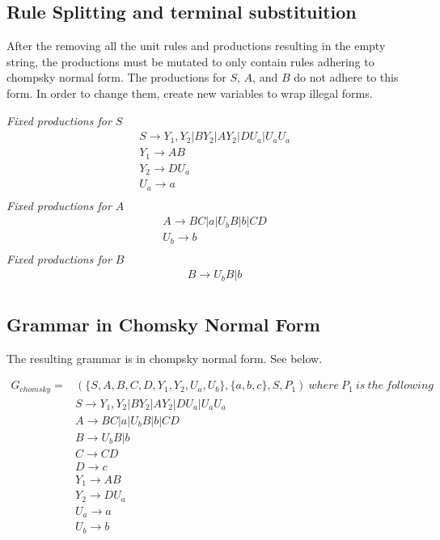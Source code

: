 \documentclass{assignment-x}
\begin{document}
\subsection{Rule Splitting and terminal substituition}
After the removing all the unit rules and productions resulting in the empty string, the productions must be mutated to only contain rules adhering to chompsky normal form. The productions for $S$, $A$, and $B$ do not adhere to this form. In order to change them, create new variables to wrap illegal forms.

\begin{center}
    \textit{Fixed productions for $S$}
    \begin{align*}
        &S \rightarrow Y_1, Y_2|BY_2|AY_2|DU_a|U_aU_a \\
        &Y_1 \rightarrow AB \\
        &Y_2 \rightarrow DU_a \\
        &U_a \rightarrow a \\
    \end{align*}
    \textit{Fixed productions for $A$}
    \begin{align*}
        &A \rightarrow BC|a|U_bB|b|CD \\
        &U_b \rightarrow b \\
    \end{align*}
    \textit{Fixed productions for $B$}
    \begin{align*}
        &B \rightarrow U_bB|b \\
    \end{align*}
\end{center}

\subsection{Grammar in Chomsky Normal Form}
The resulting grammar is in chompsky normal form. See below.

\begin{align*}
    G_{chomsky}=&(\{S,A,B,C,D,Y_1,Y_2,U_a, U_b\},\{a,b,c\}, S, P_1)\ where\ P_1\ is\ the\ following\\
    &S \rightarrow Y_1, Y_2|BY_2|AY_2|DU_a|U_aU_a \\
    &A \rightarrow BC|a|U_bB|b|CD \\
    &B \rightarrow U_bB|b \\
    &C \rightarrow CD\\
    &D \rightarrow c\\
    &Y_1 \rightarrow AB \\
    &Y_2 \rightarrow DU_a \\
    &U_a \rightarrow a \\
    &U_b \rightarrow b \\
\end{align*}
\end{document}
